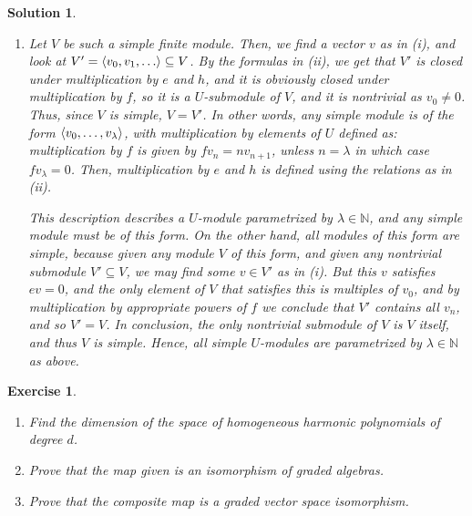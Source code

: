 \documentclass{article}
\newtheorem{ex}{Exercise}
\theoremstyle{nonumberplain}
\newtheorem{sol}{Solution}
\newcommand{\N}{\mathbb{N}}
\DeclarePairedDelimiter{\braket}{\langle}{\rangle}
\begin{document}
\begin{sol}
\begin{enumerate}
Note: the equality $e v_n = (\lambda - n + 1) v_{n-1}$ extends to $n = 0$ under the convention that $v_{-1} = 0$.

\smallskip

Now, using a reasoning similar to (i), since all $v_n$ are eigenvectors of $h$ for distinct eigenvalues, all but finitely many of them are zero. Of course, if $v_n = 0$ for some $n$, then all $v_N = 0$ for $N > n$. Moreover, we know $v_0 \neq 0$. Thus, there exists some $n \geq 0$ such that $v_n \neq 0$ and $v_{n+1} = 0$. But then, $e v_{n+1} = (\lambda - n) v_n$, and since the left-hand side is zero but $v_n \neq 0$ we conclude $\lambda = n$ which is a nonnegative integer, and so the proof is complete.

\item Let $V$ be such a simple finite module. Then, we find a vector $v$ as in (i), and look at $V' = \braket{v_0, v_1, \dots} \subseteq V$. By the formulas in (ii), we get that $V'$ is closed under multiplication by $e$ and $h$, and it is obviously closed under multiplication by $f$, so it is a $U$-submodule of $V$, and it is nontrivial as $v_0 \neq 0$. Thus, since $V$ is simple, $V = V'$. In other words, any simple module is of the form $\braket{v_0, \dots, v_\lambda}$, with multiplication by elements of $U$ defined as: multiplication by $f$ is given by $f v_n = n v_{n+1}$, unless $n = \lambda$ in which case $f v_\lambda = 0$. Then, multiplication by $e$ and $h$ is defined using the relations as in (ii).

This description describes a $U$-module parametrized by $\lambda \in \N$, and any simple module must be of this form. On the other hand, all modules of this form are simple, because given any module $V$ of this form, and given any nontrivial submodule $V' \subseteq V$, we may find some $v \in V'$ as in (i). But this $v$ satisfies $e v = 0$, and the only element of $V$ that satisfies this is multiples of $v_0$, and by multiplication by appropriate powers of $f$ we conclude that $V'$ contains all $v_n$, and so $V' = V$. In conclusion, the only nontrivial submodule of $V$ is $V$ itself, and thus $V$ is simple. Hence, all simple $U$-modules are parametrized by $\lambda \in \N$ as above.
\end{enumerate}
\end{sol}

\begin{ex}
\leavevmode
\begin{enumerate}
\item Find the dimension of the space of homogeneous harmonic polynomials of degree $d$.
\item Prove that the map given is an isomorphism of graded algebras.
\item Prove that the composite map is a graded vector space isomorphism.
\end{enumerate}
\end{ex}
\end{document}
